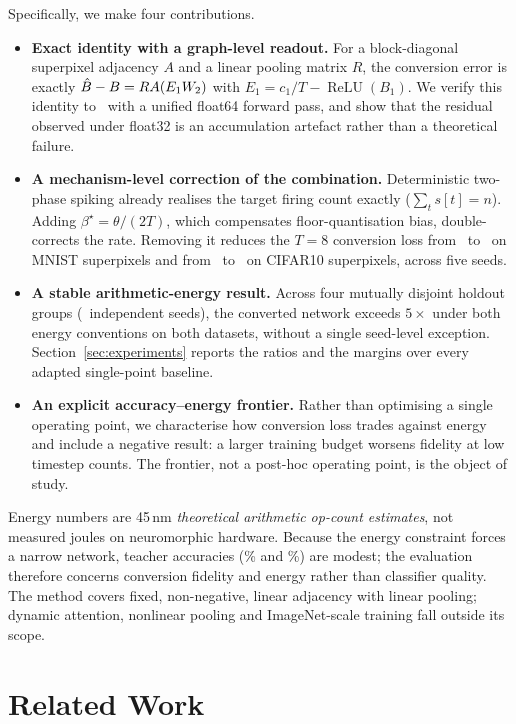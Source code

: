 Specifically, we make four contributions.

\begin{itemize}
\item \textbf{Exact identity with a graph-level readout.} For a block-diagonal superpixel adjacency $A$ and a linear pooling matrix $R$, the conversion error is exactly $\hat{B}-B = R A (E_1 W_2)$ with $E_1 = c_1/T - \operatorname{ReLU}(B_1)$. We verify this identity to \IdentityMax\ with a unified float64 forward pass, and show that the residual observed under float32 is an accumulation artefact rather than a theoretical failure.
\item \textbf{A mechanism-level correction of the combination.} Deterministic two-phase spiking already realises the target firing count exactly ($\sum_t s[t]=n$). Adding $\beta^\star=\theta/(2T)$, which compensates floor-quantisation bias, double-corrects the rate. Removing it reduces the $T{=}8$ conversion loss from \BetaLossVoneM\ to \BetaLossVtwoM\ on MNIST superpixels and from \BetaLossVoneC\ to \BetaLossVtwoC\ on CIFAR10 superpixels, across five seeds.
\item \textbf{A stable arithmetic-energy result.} Across four mutually disjoint holdout groups (\TotalSeeds\ independent seeds), the converted network exceeds $5\times$ under both energy conventions on both datasets, without a single seed-level exception. Section~\ref{sec:experiments} reports the ratios and the margins over every adapted single-point baseline.
\item \textbf{An explicit accuracy--energy frontier.} Rather than optimising a single operating point, we characterise how conversion loss trades against energy and include a negative result: a larger training budget worsens fidelity at low timestep counts. The frontier, not a post-hoc operating point, is the object of study.
\end{itemize}

Energy numbers are 45\,nm \emph{theoretical arithmetic op-count estimates}, not measured joules on neuromorphic hardware. Because the energy constraint forces a narrow network, teacher accuracies (\MNISTAnn\% and \CIFARAnn\%) are modest; the evaluation therefore concerns conversion fidelity and energy rather than classifier quality. The method covers fixed, non-negative, linear adjacency with linear pooling; dynamic attention, nonlinear pooling and ImageNet-scale training fall outside its scope.

\section{Related Work}
\label{sec:related}

